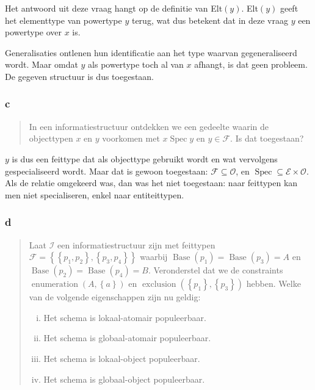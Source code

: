 \documentclass[11pt]{article}
\newcommand{\Spec}{\ensuremath{\operatorname{Spec}}}
\newcommand{\Base}{\ensuremath{\operatorname{Base}}}
\newcommand{\I}{\ensuremath{\mathcal{I}}}
\newcommand{\F}{\ensuremath{\mathcal{F}}}
\begin{document}
Het antwoord uit deze vraag hangt op de definitie van Elt$(y)$. Elt$(y)$ geeft
het elementtype van powertype $y$ terug, wat dus betekent dat in deze vraag $y$
een powertype over $x$ is. 

Generalisaties ontlenen hun identificatie aan het type waarvan gegeneraliseerd
wordt. Maar omdat $y$ als powertype toch al van $x$ afhangt, is dat geen
probleem. De gegeven structuur is dus toegestaan.

\subsubsection{c}

\begin{quote}
  In een informatiestructuur ontdekken we een gedeelte waarin de objecttypen
  $x$ en $y$ voorkomen met $x \Spec y$ en $y \in \mathcal{F}$. Is dat
  toegestaan? \cite{tentamen2011}
\end{quote}

$y$ is dus een feittype dat als objecttype gebruikt wordt en wat vervolgens
gespecialiseerd wordt. Maar dat is gewoon toegestaan: $\mathcal{F} \subseteq
\mathcal{O}$, en $\Spec \subseteq \mathcal{E} \times \mathcal{O}$. Als de relatie 
omgekeerd was, dan was het niet toegestaan: naar feittypen kan men niet 
specialiseren, enkel naar entiteittypen.

\subsubsection{d}
\label{ss2:1d}
\begin{quote}

  Laat $\I$ een informatiestructuur zijn met feittypen $\F = \left\{ \left\{ p_1,
  p_2 \right\}, \left\{ p_3, p_4 \right\} \right\}$ waarbij $\Base(p_1)
  = \Base(p_3) = A$ en $\Base(p_2) = \Base(p_4) = B$. Veronderstel dat we de
  constraints $\operatorname{enumeration}(A, \left\{ a \right\})$ en
  $\operatorname{exclusion}(\left\{ p_1 \right\}, \left\{ p_3 \right\})$
  hebben. Welke van de volgende eigenschappen zijn nu geldig: 
  \begin{enumerate}[i.]
    \item Het schema is lokaal-atomair populeerbaar.
    \item Het schema is globaal-atomair populeerbaar.
    \item Het schema is lokaal-object populeerbaar.
    \item Het schema is globaal-object populeerbaar.
  \end{enumerate} 
  \cite{tentamen2011}
\end{quote}
\end{document}
